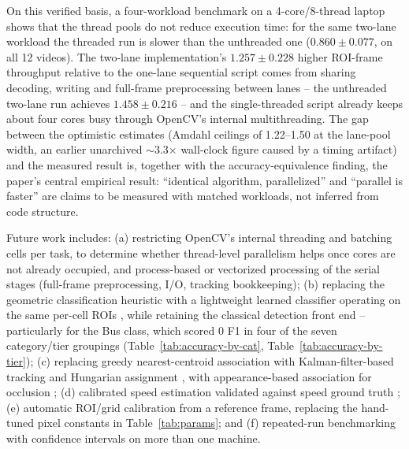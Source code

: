 \documentclass[conference]{IEEEtran}
\begin{document}
On this verified basis, a four-workload benchmark on a 4-core/8-thread
laptop shows that the thread pools do not reduce execution time: for the
same two-lane workload the threaded run is slower than the unthreaded
one ($0.860\pm0.077$, on all 12 videos). The two-lane implementation's
$1.257\pm0.228$ higher ROI-frame throughput relative to the one-lane
sequential script comes from sharing decoding, writing and full-frame
preprocessing between lanes -- the unthreaded two-lane run achieves
$1.458\pm0.216$ -- and the single-threaded script already keeps about
four cores busy through OpenCV's internal multithreading. The gap between
the optimistic estimates (Amdahl ceilings of 1.22--1.50 at the lane-pool
width, an earlier unarchived $\sim$3.3$\times$ wall-clock figure caused
by a timing artifact) and the measured result is, together with the
accuracy-equivalence finding, the paper's central empirical result:
``identical algorithm, parallelized'' and ``parallel is faster'' are
claims to be measured with matched workloads, not inferred from code
structure.

Future work includes: (a) restricting OpenCV's internal threading and
batching cells per task, to determine whether thread-level parallelism
helps once cores are not already occupied, and process-based or
vectorized processing of the serial stages (full-frame preprocessing,
I/O, tracking bookkeeping); (b) replacing the geometric classification
heuristic with a lightweight learned classifier operating on the same
per-cell ROIs \cite{chang2025,macko2025}, while retaining the classical
detection front end -- particularly for the Bus class, which scored 0
F1 in four of the seven category/tier groupings
(Table~\ref{tab:accuracy-by-cat}, Table~\ref{tab:accuracy-by-tier}); (c)
replacing greedy nearest-centroid association with Kalman-filter-based
tracking and Hungarian assignment \cite{bewley2016}, with
appearance-based association for occlusion \cite{wojke2017}; (d)
calibrated speed estimation validated against speed ground truth
\cite{kamil2024}; (e) automatic ROI/grid calibration from a reference
frame, replacing the hand-tuned pixel constants in
Table~\ref{tab:params}; and (f) repeated-run benchmarking with
confidence intervals \cite{kalibera2013} on more than one machine.
\end{document}
